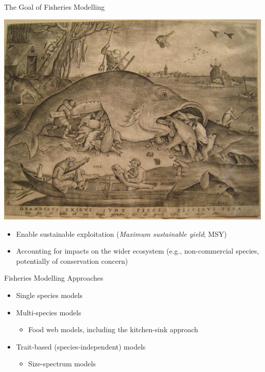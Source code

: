 \documentclass[xcolor={usenames,x11names},compress]{beamer}
\renewcommand{\(}{\begin{columns}}
\renewcommand{\)}{\end{columns}}
\newcommand{\<}[1]{\begin{column}{#1}}
\renewcommand{\>}{\end{column}}
\begin{document}

\begin{frame}{The Goal of Fisheries Modelling}

  \centering 
  \includegraphics[width=.5\textwidth]{Pieter_Fish.jpg}

  \begin{itemize}[<+->] \itemsep4pt
    \item Enable sustainable exploitation ({\it Maximum sustainable yield};  
      MSY)
    \item Accounting for impacts on the wider ecosystem (e.g., non-commercial
      species, potentially of conservation concern)
  \end{itemize}

\end{frame}

\begin{frame}{Fisheries Modelling Approaches}

  \begin{itemize}[<+->] \itemsep16pt
    \item Single species models

    \item Multi-species models
      \begin{itemize}
	\item Food web models, including the kitchen-sink approach 
      \end{itemize}

    \item Trait-based (species-independent) models
      \begin{itemize}
	\item Size-spectrum models
      \end{itemize}
  \end{itemize}
\end{frame}
\end{document}

